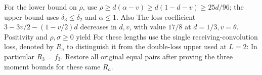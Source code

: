 For the lower bound on $\rho$, use
$\rho\ge\allowbreak  d(\alpha-v)\ge\allowbreak  d(1-d-v)\ge\allowbreak 25d/96$; the upper bound uses
$\delta_3\le\allowbreak \delta_2$ and $\alpha\le\allowbreak 1$. Also
The loss coefficient $3-3v/2-(1-v/2)d$ decreases in $d,\allowbreak v$, with value
$17/8$ at $d=\allowbreak 1/3,\allowbreak v=\allowbreak \theta$. Positivity and $\rho,\allowbreak \sigma\ge\allowbreak 0$ yield
For these lengths use the single receiving-convolution loss, denoted by
$R_a$ to distinguish it from the double-loss upper used at $L=\allowbreak 2$:
In particular $R_3=\allowbreak f_3$. Restore all original equal pairs after proving
the three moment bounds for these same $R_a$.

